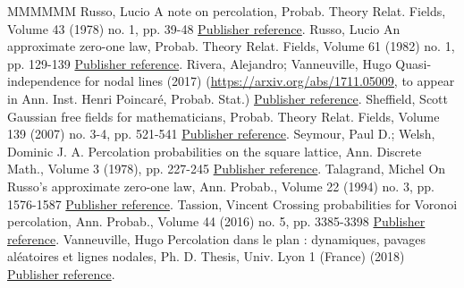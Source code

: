 \documentclass[11pt]{article}
\theoremstyle{definition}
\numberwithin{equation}{section}
\begin{document}
\begin{thebibliography}{MMMMMM}
 Russo, Lucio A note on percolation, Probab. Theory Relat. Fields, Volume 43 (1978) no. 1, pp. 39-48 \href{https://ahl.centre-mersenne.org/item/AHL_2020__3__169_0/#russo1978note}{Publisher reference}.
 Russo, Lucio An approximate zero-one law, Probab. Theory Relat. Fields, Volume 61 (1982) no. 1, pp. 129-139 \href{https://ahl.centre-mersenne.org/item/AHL_2020__3__169_0/#russo1982approximate}{Publisher reference}.
 Rivera, Alejandro; Vanneuville, Hugo Quasi-independence for nodal lines (2017) (\url{https://arxiv.org/abs/1711.05009,} to appear in Ann. Inst. Henri Poincaré, Probab. Stat.) \href{https://ahl.centre-mersenne.org/item/AHL_2020__3__169_0/#rv_rsw}{Publisher reference}.
 Sheffield, Scott Gaussian free fields for mathematicians, Probab. Theory Relat. Fields, Volume 139 (2007) no. 3-4, pp. 521-541 \href{https://ahl.centre-mersenne.org/item/AHL_2020__3__169_0/#shef_gff}{Publisher reference}.
 Seymour, Paul D.; Welsh, Dominic J. A. Percolation probabilities on the square lattice, Ann. Discrete Math., Volume 3 (1978), pp. 227-245 \href{https://ahl.centre-mersenne.org/item/AHL_2020__3__169_0/#seymour1978percolation}{Publisher reference}.
 Talagrand, Michel On Russo’s approximate zero-one law, Ann. Probab., Volume 22 (1994) no. 3, pp. 1576-1587 \href{https://ahl.centre-mersenne.org/item/AHL_2020__3__169_0/#talagrand1994russo}{Publisher reference}.
 Tassion, Vincent Crossing probabilities for Voronoi percolation, Ann. Probab., Volume 44 (2016) no. 5, pp. 3385-3398 \href{https://ahl.centre-mersenne.org/item/AHL_2020__3__169_0/#tassion2014crossing}{Publisher reference}.
 Vanneuville, Hugo Percolation dans le plan : dynamiques, pavages aléatoires et lignes nodales, Ph. D. Thesis, Univ. Lyon 1 (France) (2018) \href{https://ahl.centre-mersenne.org/item/AHL_2020__3__169_0/#hugogogo}{Publisher reference}.
\end{thebibliography}
\end{document}
